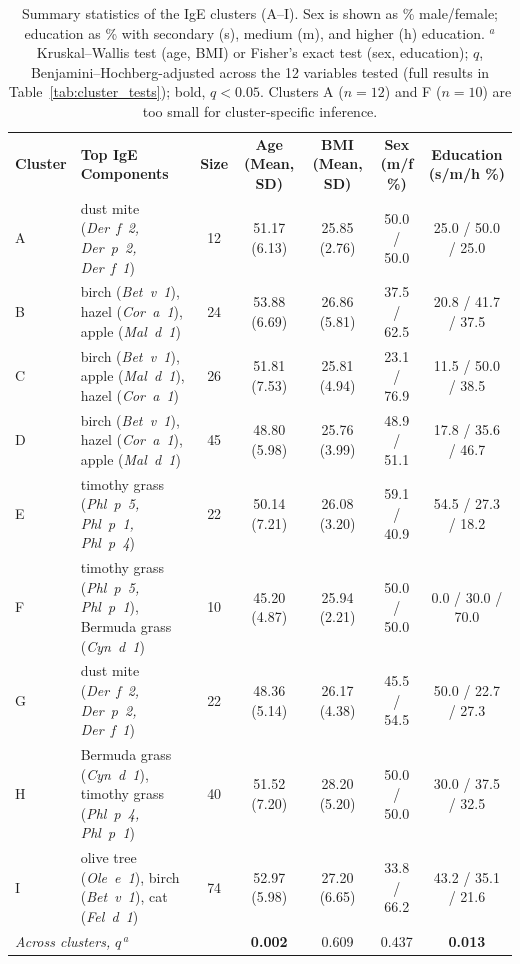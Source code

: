 \begin{table}
\centering
\small
\begin{tabular}{l p{8cm} c c c c c}

\textbf{Cluster} & \textbf{Top IgE Components} & \textbf{Size} & \textbf{Age (Mean, SD)} & \textbf{BMI (Mean, SD)} & \textbf{Sex (m/f \%)} & \textbf{Education (s/m/h \%)} \\

A & dust mite (\textit{Der~f~2, Der~p~2, Der~f~1}) & 12 & 51.17 (6.13) & 25.85 (2.76) & 50.0 / 50.0 & 25.0 / 50.0 / 25.0 \\
B & birch (\textit{Bet~v~1}), hazel (\textit{Cor~a~1}), apple (\textit{Mal~d~1}) & 24 & 53.88 (6.69) & 26.86 (5.81) & 37.5 / 62.5 & 20.8 / 41.7 / 37.5 \\
C & birch (\textit{Bet~v~1}), apple (\textit{Mal~d~1}), hazel (\textit{Cor~a~1}) & 26 & 51.81 (7.53) & 25.81 (4.94) & 23.1 / 76.9 & 11.5 / 50.0 / 38.5 \\
D & birch (\textit{Bet~v~1}), hazel (\textit{Cor~a~1}), apple (\textit{Mal~d~1}) & 45 & 48.80 (5.98) & 25.76 (3.99) & 48.9 / 51.1 & 17.8 / 35.6 / 46.7 \\
E & timothy grass (\textit{Phl~p~5, Phl~p~1, Phl~p~4}) & 22 & 50.14 (7.21) & 26.08 (3.20) & 59.1 / 40.9 & 54.5 / 27.3 / 18.2 \\
F & timothy grass (\textit{Phl~p~5, Phl~p~1}), Bermuda grass (\textit{Cyn~d~1}) & 10 & 45.20 (4.87) & 25.94 (2.21) & 50.0 / 50.0 & 0.0 / 30.0 / 70.0 \\
G & dust mite (\textit{Der~f~2, Der~p~2, Der~f~1}) & 22 & 48.36 (5.14) & 26.17 (4.38) & 45.5 / 54.5 & 50.0 / 22.7 / 27.3 \\
H & Bermuda grass (\textit{Cyn~d~1}), timothy grass (\textit{Phl~p~4, Phl~p~1}) & 40 & 51.52 (7.20) & 28.20 (5.20) & 50.0 / 50.0 & 30.0 / 37.5 / 32.5 \\
I & olive tree (\textit{Ole~e~1}), birch (\textit{Bet~v~1}), cat (\textit{Fel~d~1}) & 74 & 52.97 (5.98) & 27.20 (6.65) & 33.8 / 66.2 & 43.2 / 35.1 / 21.6 \\
\hline
\multicolumn{3}{l}{\textit{Across clusters,} $q$\,$^{a}$} & \textbf{0.002} & 0.609 & 0.437 & \textbf{0.013} \\

\end{tabular}
\caption{Summary statistics of the IgE clusters (A--I). Sex is shown as \% male/female; education as \% with secondary (s), medium (m), and higher (h) education. $^{a}$Kruskal--Wallis test (age, BMI) or Fisher's exact test (sex, education); $q$, Benjamini--Hochberg-adjusted across the 12 variables tested (full results in Table~\ref{tab:cluster_tests}); bold, $q < 0.05$. Clusters A ($n = 12$) and F ($n = 10$) are too small for cluster-specific inference.\label{tab:igee_clusters}}
\end{table}
